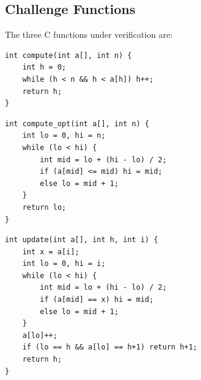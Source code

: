 \subsection{Challenge Functions}

The three C functions under verification are:

\begin{lstlisting}[style=cstyle, caption={Linear scan h-index computation}]
int compute(int a[], int n) {
    int h = 0;
    while (h < n && h < a[h]) h++;
    return h;
}
\end{lstlisting}

\begin{lstlisting}[style=cstyle, caption={Binary search h-index computation}]
int compute_opt(int a[], int n) {
    int lo = 0, hi = n;
    while (lo < hi) {
        int mid = lo + (hi - lo) / 2;
        if (a[mid] <= mid) hi = mid;
        else lo = mid + 1;
    }
    return lo;
}
\end{lstlisting}

\begin{lstlisting}[style=cstyle, caption={Incremental update with h-index maintenance}]
int update(int a[], int h, int i) {
    int x = a[i];
    int lo = 0, hi = i;
    while (lo < hi) {
        int mid = lo + (hi - lo) / 2;
        if (a[mid] == x) hi = mid;
        else lo = mid + 1;
    }
    a[lo]++;
    if (lo == h && a[lo] == h+1) return h+1;
    return h;
}
\end{lstlisting}
